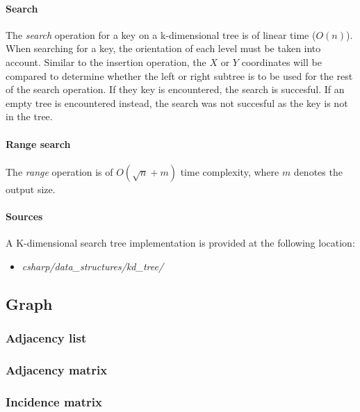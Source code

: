 \documentclass{article}
\begin{document}
\paragraph{Search}
The {\em search} operation for a key on a k-dimensional tree is of linear time (\(O(n)\)).
When searching for a key, the orientation of each level must be taken into account.
Similar to the insertion operation, the \(X\) or \(Y\) coordinates will be compared to determine
whether the left or right subtree is to be used for the rest of the search operation.
If they key is encountered, the search is succesful. If an empty tree is encountered instead,
the search was not succesful as the key is not in the tree.

\paragraph{Range search}
The {\em range} operation is of \(O(\sqrt{n} + m)\) time complexity, where \(m\) denotes the output size.


\paragraph{Sources}
A K-dimensional search tree implementation is provided at the following location:
\begin{itemize}
\item{{\em csharp/data\_structures/kd\_tree/}}
\end{itemize}




\iffalse




\newpage


\subsection{Graph}

\subsubsection{Adjacency list}


\subsubsection{Adjacency matrix}
\subsubsection{Incidence matrix}
\end{document}
